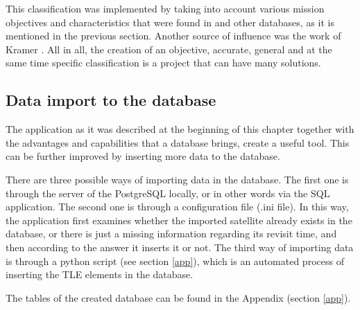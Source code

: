This classification was implemented by taking into account various mission objectives and characteristics that were found in \cite{Newspace} and other databases, as it is mentioned in the previous section. Another source of influence was the work of Kramer \cite{Kramer 2002}. All in all, the creation of an objective, accurate, general and at the same time specific classification is a project that can have many solutions.

\bigskip
\subsection{Data import to the database}
\bigskip

The application as it was described at the beginning of this chapter together with the advantages and capabilities that a database brings, create a useful tool. This can be further improved by inserting more data to the database.

There are three possible ways of importing data in the database. The first one is through the server of the PostgreSQL locally, or in other words via the SQL application. The second one is through a configuration file (.ini file). In this way, the application first examines whether the imported satellite already exists in the database, or there is just a missing information regarding its revisit time, and then according to the answer it inserts it or not. The third way of importing data is through a python script (see section \ref{app}), which is an automated process of inserting the TLE elements in the database.


\bigskip
The tables of the created database can be found in the Appendix (section \ref{app}).
